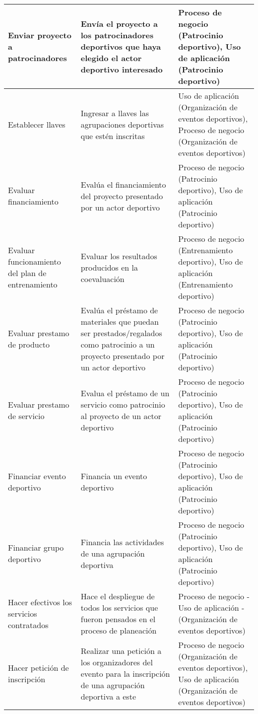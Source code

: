 \begin{center}
\begin{longtable}{|p{4cm}|p{7cm}|p{4cm}|}
		\\
		\hline
		Enviar proyecto a patrocinadores & 
		Envía el proyecto a los patrocinadores deportivos que haya elegido el actor deportivo interesado & 
		Proceso de negocio (Patrocinio deportivo), Uso de aplicación (Patrocinio deportivo)
		\\
		\hline
		Establecer llaves & 
		Ingresar a llaves las agrupaciones deportivas que estén inscritas & 
		Uso de aplicación (Organización de eventos deportivos), Proceso de negocio (Organización de eventos deportivos)
		\\
		\hline
		Evaluar financiamiento & 
		Evalúa el financiamiento del proyecto presentado por un actor deportivo & 
		Proceso de negocio (Patrocinio deportivo), Uso de aplicación (Patrocinio deportivo)
		\\
		\hline
		Evaluar funcionamiento del plan de entrenamiento & 
		Evaluar los resultados producidos en la coevaluación & 
		Proceso de negocio (Entrenamiento deportivo), Uso de aplicación (Entrenamiento deportivo)
		\\
		\hline
		Evaluar prestamo de producto & 
		Evalúa el préstamo de materiales que puedan ser prestados/regalados como patrocinio a un proyecto presentado por un actor deportivo & 
		Proceso de negocio (Patrocinio deportivo), Uso de aplicación (Patrocinio deportivo)
		\\
		\hline
		Evaluar prestamo de servicio & 
		Evalua el préstamo de un servicio como patrocinio al proyecto de un actor deportivo & 
		Proceso de negocio (Patrocinio deportivo), Uso de aplicación (Patrocinio deportivo)
		\\
		\hline
		Financiar evento deportivo & 
		Financia un evento deportivo & 
		Proceso de negocio (Patrocinio deportivo), Uso de aplicación (Patrocinio deportivo)
		\\
		\hline
		Financiar grupo deportivo & 
		Financia las actividades de una agrupación deportiva & 
		Proceso de negocio (Patrocinio deportivo), Uso de aplicación (Patrocinio deportivo)
		\\
		\hline
		Hacer efectivos los servicios contratados & 
		Hace el despliegue de todos los servicios que fueron pensados en el proceso de planeación & 
		Proceso de negocio - Uso de aplicación - (Organización de eventos deportivos)
		\\
		\hline
		Hacer petición de inscripción & 
		Realizar una petición a los organizadores del evento para la inscripción de una agrupación deportiva a este & 
		Proceso de negocio (Organización de eventos deportivos), Uso de aplicación (Organización de eventos deportivos)

\end{longtable}
\end{center}
